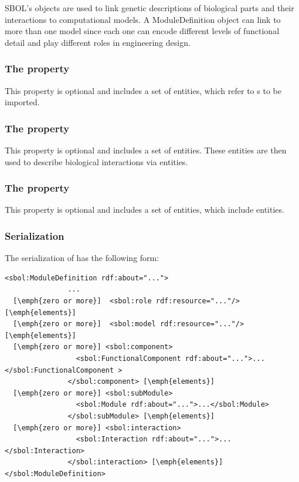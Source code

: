 SBOL's  objects are used to link genetic descriptions of biological parts and their interactions to computational models.
A ModuleDefinition object can link to more than one model since each one can encode different levels of functional detail and play different roles in engineering design. 


\subsubsection*{The  property}\label{sec:modules}
This property is optional and includes a set of  entities, which refer to s to be imported.

\subsubsection*{The  property}
\label{sec:functionalComponents}
This property is optional and includes a set of  entities. These entities are then used to describe biological interactions via  entities.


\subsubsection*{The  property}\label{sec:interactions}
This property is optional and includes a set of  entities, which include  entities.

\subsubsection*{Serialization}

The serialization of  has the following form:
\begin{lstlisting}
<sbol:ModuleDefinition rdf:about="...">
               ...
  [\emph{zero or more}]  <sbol:role rdf:resource="..."/> [\emph{elements}]
  [\emph{zero or more}]  <sbol:model rdf:resource="..."/> [\emph{elements}]
  [\emph{zero or more}] <sbol:component>
                 <sbol:FunctionalComponent rdf:about="...">...</sbol:FunctionalComponent >
               </sbol:component> [\emph{elements}]
  [\emph{zero or more}] <sbol:subModule>
                 <sbol:Module rdf:about="...">...</sbol:Module>
               </sbol:subModule> [\emph{elements}]
  [\emph{zero or more}] <sbol:interaction>
                 <sbol:Interaction rdf:about="...">...</sbol:Interaction>
               </sbol:interaction> [\emph{elements}]
</sbol:ModuleDefinition>
\end{lstlisting}

